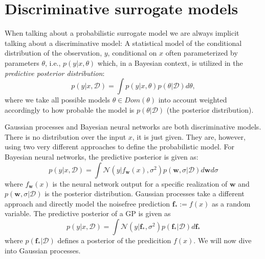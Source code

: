 \chapter{Discriminative surrogate models}

When talking about a probabilistic surrogate model we are always implicit talking about a
discriminative model: A statistical model of the conditional distribution of the observation, $y$, 
conditional on $x$ often parameterized by parameters $\theta$, i.e., $p(y|x, \theta)$ 
which, in a Bayesian context, is utilized in the \textit{predictive posterior
distribution}:
$$p(y|x,\mathcal{D}) = \int p(y|x, \theta)p(\theta|\mathcal{D}) d\theta,$$ where we take all
possible models $\theta \in Dom(\theta)$ into account weighted accordingly to how probable the
model is $p(\theta|\mathcal{D})$ (the posterior distribution). 

Gaussian processes and Bayesian neural networks are both discriminative models. There is no
distribution over the input $x$, it is just given. They are, however, using two very different
approaches to define the probabilistic model. 
For Bayesian neural networks, the predictive posterior is given as:
$$ p(y|x,\mathcal{D}) = \int \mathcal{N}(y|f_{\textbf{w}}(x),
\sigma^2)p(\textbf{w},\sigma|\mathcal{D}) d \textbf{w} d\sigma$$ where $f_\textbf{w}(x)$ is the
neural network output for a specific realization of $\textbf{w}$ and
$p(\textbf{w},\sigma|\mathcal{D})$ is the posterior distribution. Gaussian processes take a
different approach and directly model the noisefree prediction $\textbf{f}_* := f(x)$ as a random
variable. The predictive posterior of a GP is given as
$$ p(y|x,\mathcal{D}) = \int \mathcal{N}(y|\textbf{f}_*, \sigma^2) p(\textbf{f}_*|\mathcal{D}) d \textbf{f}_*$$
where $p(\textbf{f}_*|\mathcal{D})$ defines a posterior of the
predicition $f(x)$. We will now dive into Gaussian processes.

